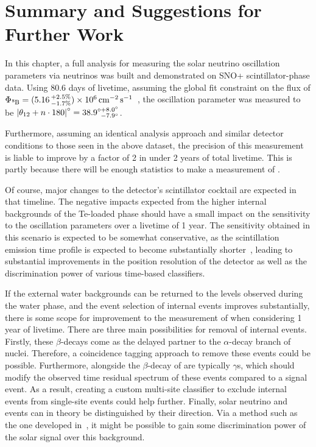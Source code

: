 \section{Summary and Suggestions for Further Work}\label{sec:solar_summary}
In this chapter, a full analysis for measuring the solar neutrino oscillation parameters via \beight{} neutrinos was built and demonstrated on SNO+ scintillator-phase data. Using 80.6 days of livetime, assuming the global fit constraint on the \beight{} flux of $\Phi_{\beight{}} = (5.16\,^{+2.5\%}_{-1.7\%})\times 10^{6}\,\si{\per\cm\squared\per\second}$~\cite{bergstromUpdatedDeterminationSolar2016}, %
the oscillation parameter \tonetwo{} was measured to be $\left|\theta_{12}{} + n\cdot180\right|^{\circ} = 38.9^{\circ+8.0^{\circ}}_{\phantom{\circ}-7.9^{\circ}}$.

Furthermore, assuming an identical analysis approach and similar detector conditions to those seen in the above dataset, the precision of this measurement is liable to improve by a factor of 2 in under 2 years of total livetime. This is partly because there will be enough statistics to make a measurement of \dmsq{}.

Of course, major changes to the detector's scintillator cocktail are expected in that timeline. The negative impacts expected from the higher internal backgrounds of the Te-loaded phase should have a small impact on the sensitivity to the oscillation parameters over a livetime of 1 year. The sensitivity obtained in this scenario is expected to be somewhat conservative, as the scintillation emission time profile is expected to become substantially shorter~\cite{autyMethodLoadTellurium2023}, %
leading to substantial improvements in the position resolution of the detector as well as the discrimination power of various time-based classifiers.

If the external water backgrounds can be returned to the levels observed during the water phase, and the event selection of internal  events improves substantially, there is some scope for improvement to the measurement of \tonetwo{} when considering 1 year of livetime. There are three main possibilities for removal of internal  events. Firstly, these $\beta$-decays come as the delayed partner to the $\alpha$-decay branch of  nuclei. Therefore, a coincidence tagging approach to remove these events could be possible. Furthermore, alongside the $\beta$-decay of  are typically $\gamma$s, which should modify the observed time residual spectrum of these events compared to a \beight{} signal event. As a result, creating a custom multi-site classifier to exclude internal  events from single-site events could help further. Finally, solar neutrino and  events can in theory be distinguished by their direction. Via a method such as the one developed in~\cite{allegaEventbyEventDirectionReconstruction2023,patonDirectionalReconstructionLiquid2023}, %
it might be possible to gain some discrimination power of the solar signal over this background.

